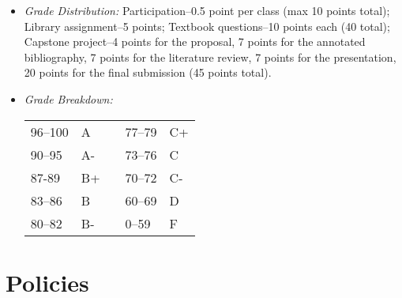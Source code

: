 \documentclass[article,oneside]{memoir}
\begin{document}
\begin{itemize}
\item \textit{Grade Distribution:}  Participation--0.5 point per class (max 10 points total); Library assignment--5 points; Textbook questions--10 points each (40 total); Capstone project--4 points for the proposal, 7 points for the annotated bibliography, 7 points for the literature review, 7 points for the presentation, 20 points for the final submission (45 points total).

\item \textit{Grade Breakdown:}

 \begin{tabular}{ | l | l | p{2cm} | l | l | }
    \hline 
96--100 & A  & &  77--79 &  C+ \\  
90--95 & A- & &  73--76 & C \\
87-89 & B+ &  &  70--72 & C- \\ 
83--86 & B  & &  60--69 & D\\
80--82 & B- & & 0--59 & F\\ \hline
    \end{tabular}


\end{itemize}





\section{Policies}
\end{document}
